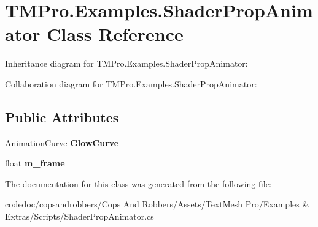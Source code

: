\hypertarget{classTMPro_1_1Examples_1_1ShaderPropAnimator}{}\section{T\+M\+Pro.\+Examples.\+Shader\+Prop\+Animator Class Reference}
\label{classTMPro_1_1Examples_1_1ShaderPropAnimator}


Inheritance diagram for T\+M\+Pro.\+Examples.\+Shader\+Prop\+Animator\+:


Collaboration diagram for T\+M\+Pro.\+Examples.\+Shader\+Prop\+Animator\+:
\subsection*{Public Attributes}
\begin{DoxyCompactItemize}
\item 
\mbox{\label{classTMPro_1_1Examples_1_1ShaderPropAnimator_a5b9d48d8e4affbb0d205aa88136919f1}} 
Animation\+Curve {\bfseries Glow\+Curve}
\item 
\mbox{\label{classTMPro_1_1Examples_1_1ShaderPropAnimator_a6e28899cd07f82e7b51db5d99d06abc0}} 
float {\bfseries m\+\_\+frame}
\end{DoxyCompactItemize}


The documentation for this class was generated from the following file\+:\begin{DoxyCompactItemize}
\item 
codedoc/copsandrobbers/\+Cops And Robbers/\+Assets/\+Text\+Mesh Pro/\+Examples \& Extras/\+Scripts/Shader\+Prop\+Animator.\+cs\end{DoxyCompactItemize}
